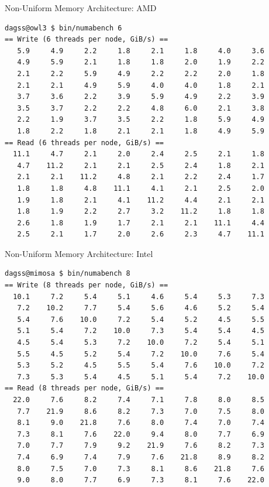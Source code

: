 \documentclass[sans,mathserif]{beamer}
\begin{document}
\begin{frame}[fragile]{Non-Uniform Memory Architecture: AMD}
\footnotesize
\begin{verbatim}
dagss@owl3 $ bin/numabench 6 
== Write (6 threads per node, GiB/s) ==
   5.9     4.9     2.2     1.8     2.1     1.8     4.0     3.6  
   4.9     5.9     2.1     1.8     1.8     2.0     1.9     2.2  
   2.1     2.2     5.9     4.9     2.2     2.2     2.0     1.8  
   2.1     2.1     4.9     5.9     4.0     4.0     1.8     2.1  
   3.7     3.6     2.2     3.9     5.9     4.9     2.2     3.9  
   3.5     3.7     2.2     2.2     4.8     6.0     2.1     3.8  
   2.2     1.9     3.7     3.5     2.2     1.8     5.9     4.9  
   1.8     2.2     1.8     2.1     2.1     1.8     4.9     5.9  
== Read (6 threads per node, GiB/s) ==
  11.1     4.7     2.1     2.0     2.4     2.5     2.1     1.8  
   4.7    11.2     2.1     2.1     2.5     2.4     1.8     2.1  
   2.1     2.1    11.2     4.8     2.1     2.2     2.4     1.7  
   1.8     1.8     4.8    11.1     4.1     2.1     2.5     2.0  
   1.9     1.8     2.1     4.1    11.2     4.4     2.1     2.1  
   1.8     1.9     2.2     2.7     3.2    11.2     1.8     1.8  
   2.6     1.8     1.9     1.7     2.1     2.1    11.1     4.4  
   2.5     2.1     1.7     2.0     2.6     2.3     4.7    11.1  
\end{verbatim}
\end{frame}


\begin{frame}[fragile]{Non-Uniform Memory Architecture: Intel}
\footnotesize
\begin{verbatim}
dagss@mimosa $ bin/numabench 8 
== Write (8 threads per node, GiB/s) ==
  10.1     7.2     5.4     5.1     4.6     5.4     5.3     7.3  
   7.2    10.2     7.7     5.4     5.6     4.6     5.2     5.4  
   5.4     7.6    10.0     7.2     5.4     5.2     4.5     5.5  
   5.1     5.4     7.2    10.0     7.3     5.4     5.4     4.5  
   4.5     5.4     5.3     7.2    10.0     7.2     5.4     5.1  
   5.5     4.5     5.2     5.4     7.2    10.0     7.6     5.4  
   5.3     5.2     4.5     5.5     5.4     7.6    10.0     7.2  
   7.3     5.3     5.4     4.5     5.1     5.4     7.2    10.0  
== Read (8 threads per node, GiB/s) ==
  22.0     7.6     8.2     7.4     7.1     7.8     8.0     8.5  
   7.7    21.9     8.6     8.2     7.3     7.0     7.5     8.0  
   8.1     9.0    21.8     7.6     8.0     7.4     7.0     7.4  
   7.3     8.1     7.6    22.0     9.4     8.0     7.7     6.9  
   7.0     7.7     7.9     9.2    21.9     7.6     8.2     7.3  
   7.4     6.9     7.4     7.9     7.6    21.8     8.9     8.2  
   8.0     7.5     7.0     7.3     8.1     8.6    21.8     7.6  
   9.0     8.0     7.7     6.9     7.3     8.1     7.6    22.0  
\end{verbatim}
\end{frame}
\end{document}
